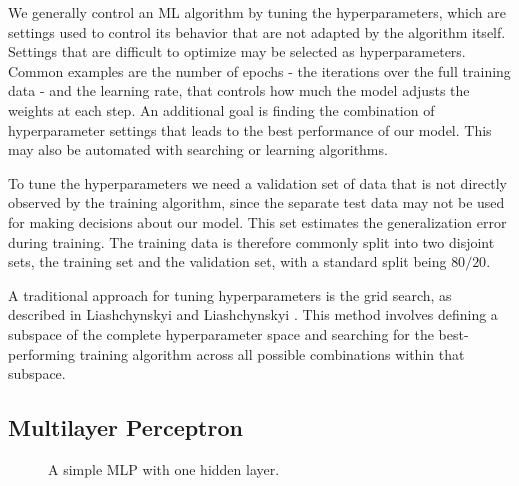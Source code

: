 We generally control an ML algorithm by tuning the hyperparameters, which are settings used to control its behavior that are not adapted by the algorithm itself. Settings that are difficult to optimize may be selected as hyperparameters. Common examples are the number of epochs - the iterations over the full training data - and the learning rate, that controls how much the model adjusts the weights at each step. An additional goal is finding the combination of hyperparameter settings that leads to the best performance of our model. This may also be automated with searching or learning algorithms.

To tune the hyperparameters we need a validation set of data that is not directly observed by the training algorithm, since the separate test data may not be used for making decisions about our model. This set estimates the generalization error during training. The training data is therefore commonly split into two disjoint sets, the training set and the validation set, with a standard split being $80/20$.

A traditional approach for tuning hyperparameters is the grid search, as described in Liashchynskyi and Liashchynskyi \cite{liashchynskyi2019grid}. This method involves defining a subspace of the complete hyperparameter space and searching for the best-performing training algorithm across all possible combinations within that subspace.

\subsection{Multilayer Perceptron}

\begin{figure}
    \centering
    \caption{A simple MLP with one hidden layer.}
    \label{fig:2layer_mlp}
  \end{figure}

